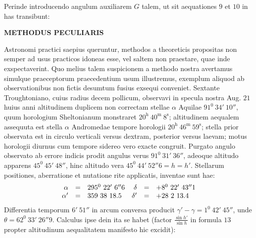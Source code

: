 Perinde introducendo angulum auxiliarem $G$ talem, ut sit
aequationes $9$ et $10$ in has transibunt:
\clearpage
\thispagestyle{empty}
\noindent{}%
%
\parbox[t]{\dimexpr\linewidth-24mm\relax}{\centering\footnotesize\bfseries METHODUS PECULIARIS\par}%
\makebox[12mm][r]{}\par\nobreak\medskip
{}
Astronomi practici saepius queruntur, methodos a theoreticis propositas non semper ad usus practicos idoneas esse, vel saltem non praestare, quae inde exspectaverint. Quo melius talem suspicionem a methodo nostra avertamus simulque praeceptorum praecedentium usum illustremus, exemplum aliquod ab observationibus non fictis desumtum fusius exsequi conveniet. Sextante Troughtoniano, cuius radius decem pollicum, observavi in specula nostra Aug. $21$ huius anni altitudinem duplicem non correctam stellae $\alpha$ Aquilae $91^0\ 34'\ 10''$, quum horologium Sheltonianum monstraret $20^{\mathrm h}\ 40^{\mathrm m}\ 8^{\mathrm s}$; altitudinem aequalem assequuta est stella $\alpha$ Andromedae tempore horologii $20^{\mathrm h}\ 46^{\mathrm m}\ 59^{\mathrm s}$; stella prior observata est in circulo verticali versus dextram, posterior versus laevam; motus horologii diurnus cum tempore sidereo vero exacte congruit. Purgato angulo observato ab errore indicis prodit angulus verus $91^0\ 31'\ 36''$, adeoque altitudo apparens $45^0\ 45'\ 48''$, hinc altitudo vera $45^0\ 44'\ 52''6=h=h'$. Stellarum positiones, aberratione et nutatione rite applicatis, inventae sunt hae:
\[
\begin{array}{rcl@{\quad}rcl}
\alpha&=&295^0\ 22'\ 6''6&\delta&=&+8^0\ 22'\ 43''1\\
\alpha'&=&359\ 38\ 18.5&\delta'&=&+28\ 2\ 13.4
\end{array}
\]
Differentia temporum $6'\ 51''$ in arcum conversa producit $\gamma'-\gamma=1^0\ 42'\ 45''$, unde $\theta=62^0\ 33'\ 26''9$. Calculus ipse dein ita se habet (factor $\frac{\sin h'}{\sin h}$ in formula $13$ propter altitudinum aequalitatem manifesto hic excidit):
